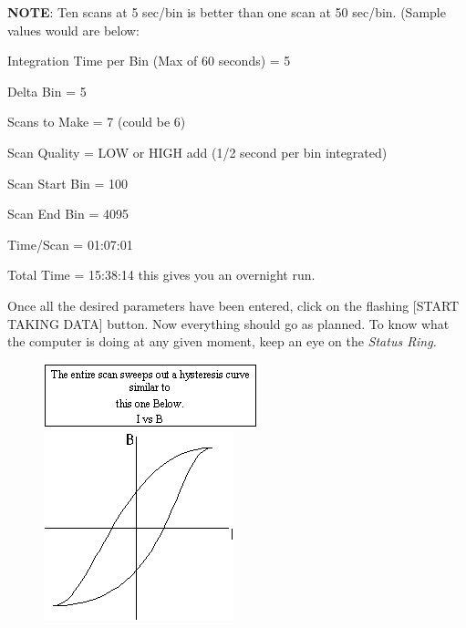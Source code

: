 \documentclass{../lab}
\begin{document}
\textbf{NOTE}: Ten scans at 5 sec/bin is better than one scan at 50 sec/bin. (Sample values would are below:

Integration Time per Bin (Max of 60 seconds) = 5

Delta Bin = 5

Scans to Make = 7 (could be 6)

Scan Quality = LOW or HIGH add (1/2 second per bin integrated)

Scan Start Bin = 100

Scan End Bin = 4095

Time/Scan = 01:07:01

Total Time = 15:38:14 this gives you an overnight run.

Once all the desired parameters have been entered, click on the flashing [START TAKING DATA] button. Now everything should go as planned. To know what the computer is doing at any given moment, keep an eye on the \emph{Status Ring.}


\begin{figure}[h]
    \centering
    \href{http://experimentationlab.berkeley.edu/sites/default/files/images/BRAimage032.gif}{\includegraphics[width=0.5\linewidth]{images/BRAimage032.png}}
    \href{http://experimentationlab.berkeley.edu/sites/default/files/images/BRAimage034.gif}{\includegraphics[width=0.5\linewidth]{images/BRAimage034.png}}
\end{figure}
\end{document}
